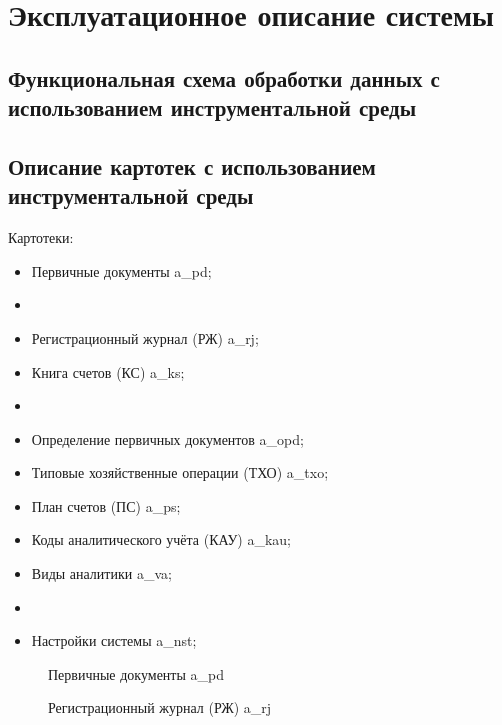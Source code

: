 \section{Эксплуатационное описание системы}

\subsection{Функциональная схема обработки данных с использованием инструментальной среды}
\newpage

\subsection{Описание картотек с использованием инструментальной среды}

Картотеки:

\begin{itemize}
    \item Первичные документы \gpiFIO\/a\_pd;
    \item[] \hspace{0pt}
    \item Регистрационный журнал (РЖ) \gpiFIO\/a\_rj;
    \item Книга счетов (КС) \gpiFIO\/a\_ks;
    \item[] \hspace{0pt}
    \item Определение первичных документов \gpiFIO\/a\_opd;
    \item Типовые хозяйственные операции (ТХО) \gpiFIO\/a\_txo;
    \item План счетов (ПС) \gpiFIO\/a\_ps;
    \item Коды аналитического учёта (КАУ) \gpiFIO\/a\_kau;
    \item Виды аналитики \gpiFIO\/a\_va;
    \item[] \hspace{0pt}
    \item Настройки системы \gpiFIO\/a\_nst;
\end{itemize}

\begin{figure}[h!]
    \centering
    \caption{Первичные документы \gpiFIO\/a\_pd}
\end{figure}

\begin{figure}[h!]
    \centering
    \caption{Регистрационный журнал (РЖ) \gpiFIO\/a\_rj}
\end{figure}

